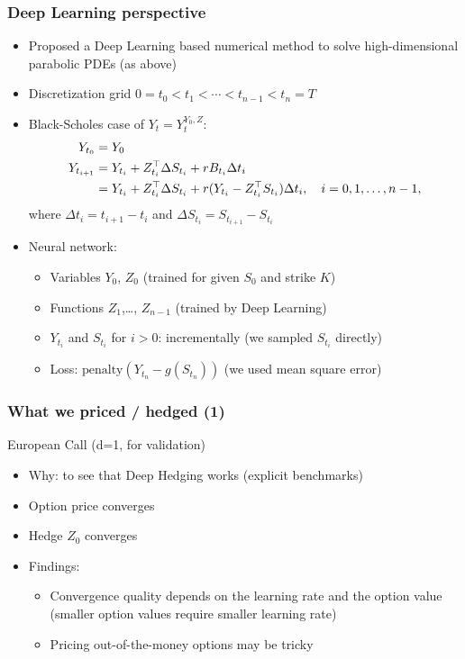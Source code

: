 \documentclass[mathserif,10pt]{beamer}
\renewcommand{\alert}[1]{\textcolor{MyRed}{#1}\xspace}
\newcommand{\inStructColor}[1]{\textcolor{MyNewDelftBlue}{#1}}
\begin{document}
%
\begin{frame}
\frametitle{Deep Learning perspective}
\begin{block}{}
\begin{itemize}
\item 
Proposed a Deep Learning based numerical method to solve high-dimensional parabolic PDEs (as above)
\item 
Discretization grid $0=t_0 < t_1 < \cdots < t_{n-1} < t_n = T$
\item  
Black-Scholes case of $Y_t=Y_t^{Y_0,Z}$: 
\begin{align*}
Y_{t_0} 
&= 
Y_0 \\
Y_{t_{i+1}} 
&= 
Y_{t_i} + Z_{t_i}^{\top} \Delta S_{ t_i} +  r B_{t_i} \Delta t_i\\
&=
Y_{t_i} + Z_{t_i}^{\top} \Delta S_{t_i} +  r (Y_{t_i} - Z_{t_i}^{\top} S_{t_i}) \Delta t_i, 
\quad i=0,1,\ldots, n-1,
\end{align*}
where $\Delta t_i = t_{i+1} - t_i$ and  $\Delta S_{t_i} = S_{t_{i+1}} - S_{t_i}$ 
\item
Neural network: 
\begin{itemize}
\item Variables $Y_0$,  $Z_0$ (trained for given $S_0$ and strike $K$)
\item Functions $Z_1$,\ldots, $Z_{n-1}$ (trained by \inStructColor{Deep Learning})
\item $Y_{t_i}$ and $S_{t_i}$ for $i>0$: \inStructColor{incrementally} (we sampled $S_{t_i}$ \alert{directly})
\item Loss: $\mathrm{penalty}(Y_{t_n} - g(S_{t_n}))$ (we used \alert{mean square error})
\end{itemize}
\end{itemize}
\end{block}
%
\end{frame}

\begin{frame}
\frametitle{What we priced / hedged (1)}
\begin{block}{European Call (d=1, for validation)}
\begin{itemize}
\item
Why: to see that Deep Hedging works (explicit benchmarks)
\item
Option price converges 
\item 
Hedge $Z_0$ converges 
\item Findings:
\begin{itemize}
\item
Convergence quality depends on the learning rate and the option value 
(smaller option values require smaller learning rate)
\item
Pricing out-of-the-money options may be tricky
\end{itemize}
\end{itemize}
\end{block}
\end{frame}
\end{document}

